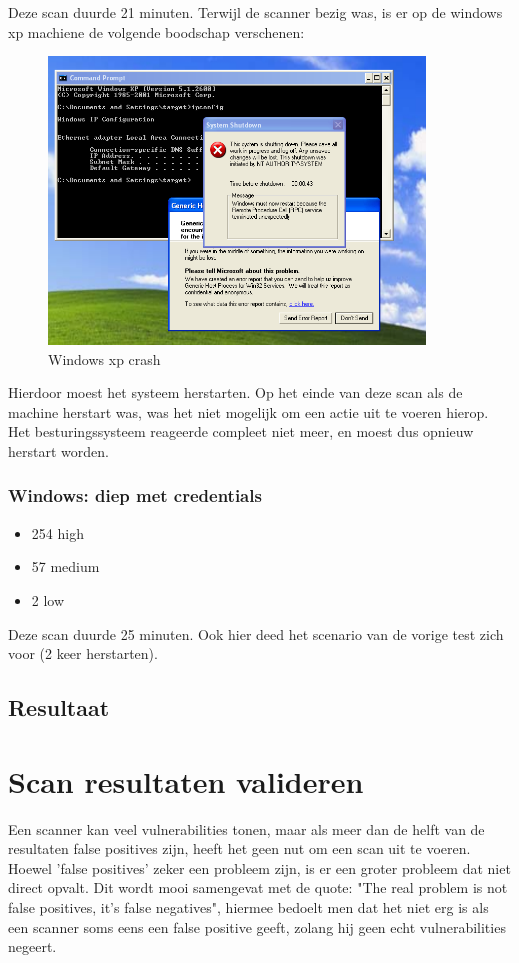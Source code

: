 Deze scan duurde 21 minuten. Terwijl de scanner bezig was, is er op de windows xp machiene de volgende boodschap verschenen: 


\begin{figure}[h]
\caption{Windows xp crash}
\includegraphics[width=10.0cm]{img/openvas-full.png}
\end{figure}


Hierdoor moest het systeem herstarten. Op het einde van deze scan als de machine herstart was, was het niet mogelijk om een actie uit te voeren hierop. Het besturingssysteem reageerde compleet niet meer, en moest dus opnieuw herstart worden.

\subsubsection{Windows: diep met credentials}

\begin{itemize}
\item 254 high
\item 57 medium
\item 2 low
\end{itemize}

Deze scan duurde 25 minuten. Ook hier deed het scenario van de vorige test zich voor (2 keer herstarten).

\subsection{Resultaat}

\section{Scan resultaten valideren}

Een scanner kan veel vulnerabilities tonen, maar als meer dan de helft van de resultaten false positives zijn, heeft het geen nut om een scan uit te voeren. Hoewel 'false positives' zeker een probleem zijn, is er een groter probleem dat niet direct opvalt. Dit wordt mooi samengevat met de quote: "The real problem is not false positives, it's false negatives", hiermee bedoelt men dat het niet erg is als een scanner soms eens een false positive geeft, zolang hij geen echt vulnerabilities negeert.

